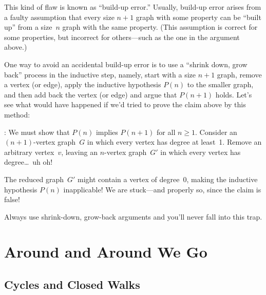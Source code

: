This kind of flaw is known as ``build-up error.''  Usually, build-up
error arises from a faulty assumption that every size $n + 1$ graph
with some property can be ``built up'' from a size~$n$ graph with the
same property.  (This assumption is correct for some properties, but
incorrect for others---such as the one in the argument above.)

One way to avoid an accidental build-up error is to use a ``shrink
down, grow back'' process in the inductive step, namely, start with a
size $n+1$ graph, remove a vertex (or edge), apply the inductive
hypothesis $P(n)$ to the smaller graph, and then add back the vertex
(or edge) and argue that $P(n + 1)$ holds.  Let's see what would have
happened if we'd tried to prove the claim above by this method:

: We must show that $P(n)$
implies $P(n + 1)$ for all $n \ge 1$.  Consider an $(n + 1)$-vertex
graph~$G$ in which every vertex has degree at least~1.  Remove an
arbitrary vertex~$v$, leaving an $n$-vertex graph~$G'$ in which every
vertex has degree\dots\ uh oh!

The reduced graph~$G'$ might contain a vertex of degree~0, making the
inductive hypothesis $P(n)$ inapplicable!  We are stuck---and
properly so, since the claim is false!

Always use shrink-down, grow-back arguments and you'll never fall into
this trap.



\begin{problems}
\classproblems
{}
\homeworkproblems
{}


\homeworkproblems
{}
\end{problems}

\section{Around and Around We Go}

\subsection{Cycles and Closed Walks}

